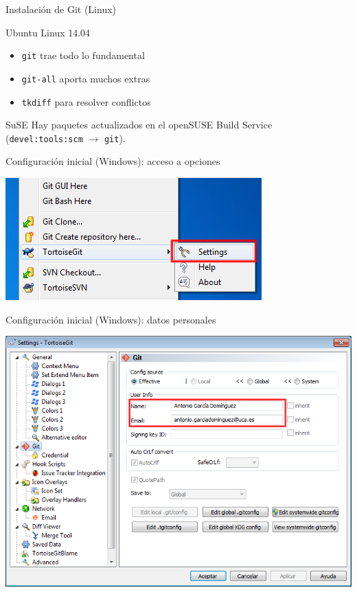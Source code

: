 \documentclass[xcolor=svgnames]{beamer}
\newcommand*{\paquete}[1]{\texttt{#1}}
\begin{document}
\begin{frame}{Instalación de Git (Linux)}
  \begin{block}{Ubuntu Linux 14.04}
    \begin{itemize}
    \item \paquete{git} trae todo lo fundamental
    \item \paquete{git-all} aporta muchos extras
    \item \paquete{tkdiff} para resolver conflictos
    \end{itemize}
  \end{block}

  \begin{block}{SuSE}
    Hay paquetes actualizados en el openSUSE Build Service
    (\paquete{devel:tools:scm} $\rightarrow$ \paquete{git}).
  \end{block}
\end{frame}

\begin{frame}{Configuración inicial (Windows): acceso a opciones}
  \begin{center}
    \includegraphics[width=\textwidth,height=.8\textheight,keepaspectratio]{tomas/configinicial-00-menu}
  \end{center}
\end{frame}

\begin{frame}{Configuración inicial (Windows): datos personales}
  \begin{center}
    \includegraphics[width=\textwidth,height=.8\textheight,keepaspectratio]{tomas/configinicial-01-pantalla}
  \end{center}
\end{frame}
\end{document}
